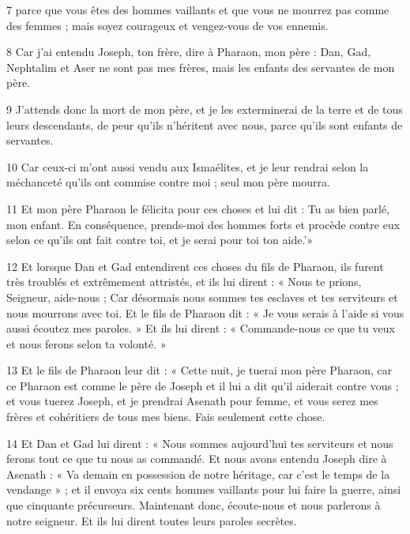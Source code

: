\par 7 parce que vous êtes des hommes vaillants et que vous ne mourrez pas comme des femmes ; mais soyez courageux et vengez-vous de vos ennemis.

\par 8 Car j'ai entendu Joseph, ton frère, dire à Pharaon, mon père : Dan, Gad, Nephtalim et Aser ne sont pas mes frères, mais les enfants des servantes de mon père.

\par 9 J'attends donc la mort de mon père, et je les exterminerai de la terre et de tous leurs descendants, de peur qu'ils n'héritent avec nous, parce qu'ils sont enfants de servantes.

\par 10 Car ceux-ci m'ont aussi vendu aux Ismaélites, et je leur rendrai selon la méchanceté qu'ils ont commise contre moi ; seul mon père mourra.

\par 11 Et mon père Pharaon le félicita pour ces choses et lui dit : Tu as bien parlé, mon enfant. En conséquence, prends-moi des hommes forts et procède contre eux selon ce qu'ils ont fait contre toi, et je serai pour toi ton aide.'»

\par 12 Et lorsque Dan et Gad entendirent ces choses du fils de Pharaon, ils furent très troublés et extrêmement attristés, et ils lui dirent : « Nous te prions, Seigneur, aide-nous ; Car désormais nous sommes tes esclaves et tes serviteurs et nous mourrons avec toi. Et le fils de Pharaon dit : « Je vous serais à l'aide si vous aussi écoutez mes paroles. » Et ils lui dirent : « Commande-nous ce que tu veux et nous ferons selon ta volonté. »

\par 13 Et le fils de Pharaon leur dit : « Cette nuit, je tuerai mon père Pharaon, car ce Pharaon est comme le père de Joseph et il lui a dit qu'il aiderait contre vous ; et vous tuerez Joseph, et je prendrai Asenath pour femme, et vous serez mes frères et cohéritiers de tous mes biens. Fais seulement cette chose.

\par 14 Et Dan et Gad lui dirent : « Nous sommes aujourd'hui tes serviteurs et nous ferons tout ce que tu nous as commandé. Et nous avons entendu Joseph dire à Asenath : « Va demain en possession de notre héritage, car c'est le temps de la vendange » ; et il envoya six cents hommes vaillants pour lui faire la guerre, ainsi que cinquante précurseurs. Maintenant donc, écoute-nous et nous parlerons à notre seigneur. Et ils lui dirent toutes leurs paroles secrètes.

